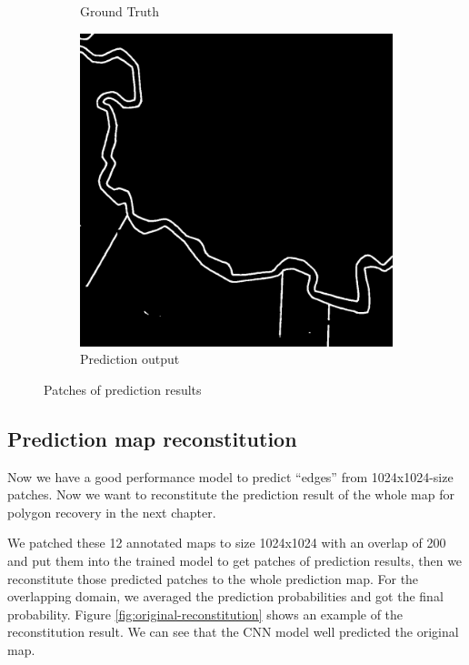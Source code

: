 \documentclass[12pt]{article}
\begin{document}
\begin{figure}[H]
\begin{subfigure}[b]{.28\textwidth}
\begin{minipage}[t]{1\linewidth}
			\caption{Ground Truth}
		\end{minipage}
	\end{subfigure}
	\begin{subfigure}[b]{.28\textwidth}
		\begin{minipage}[t]{1\linewidth}
			\centering
			\includegraphics[width=1\linewidth]{images/patches/pre10.png}
		    \caption{Prediction output}
		\end{minipage}
	\end{subfigure}
	
    \caption{Patches of prediction results}
    \label{fig:pre_res}
\end{figure}



\subsection{Prediction map reconstitution}
Now we have a good performance model to predict “edges” from 1024x1024-size patches. Now we want to reconstitute the prediction result of the whole map for polygon recovery in the next chapter.

We patched these 12 annotated maps to size 1024x1024 with an overlap of 200 and put them into the trained model to get patches of prediction results, then we reconstitute those predicted patches to the whole prediction map. For the overlapping domain, we averaged the prediction probabilities and got the final probability. Figure \ref{fig:original-reconstitution} shows an example of the reconstitution result. We can see that the CNN model well predicted the original map.
\end{document}
